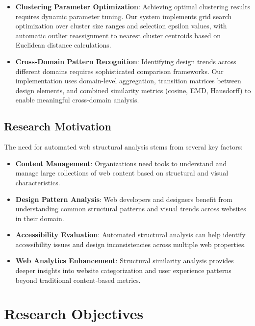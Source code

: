 \begin{itemize}
    \item \textbf{Clustering Parameter Optimization}: Achieving optimal clustering results requires dynamic parameter tuning. Our system implements grid search optimization over cluster size ranges and selection epsilon values, with automatic outlier reassignment to nearest cluster centroids based on Euclidean distance calculations.
    
    \item \textbf{Cross-Domain Pattern Recognition}: Identifying design trends across different domains requires sophisticated comparison frameworks. Our implementation uses domain-level aggregation, transition matrices between design elements, and combined similarity metrics (cosine, EMD, Hausdorff) to enable meaningful cross-domain analysis.
\end{itemize}

\subsection{Research Motivation}
\label{subsec:research-motivation}

The need for automated web structural analysis stems from several key factors:

\begin{itemize}
    \item \textbf{Content Management}: Organizations need tools to understand and manage large collections of web content based on structural and visual characteristics.
    
    \item \textbf{Design Pattern Analysis}: Web developers and designers benefit from understanding common structural patterns and visual trends across websites in their domain.
    
    \item \textbf{Accessibility Evaluation}: Automated structural analysis can help identify accessibility issues and design inconsistencies across multiple web properties.
    
    \item \textbf{Web Analytics Enhancement}: Structural similarity analysis provides deeper insights into website categorization and user experience patterns beyond traditional content-based metrics.
\end{itemize}

\section{Research Objectives}
\label{sec:objectives}

